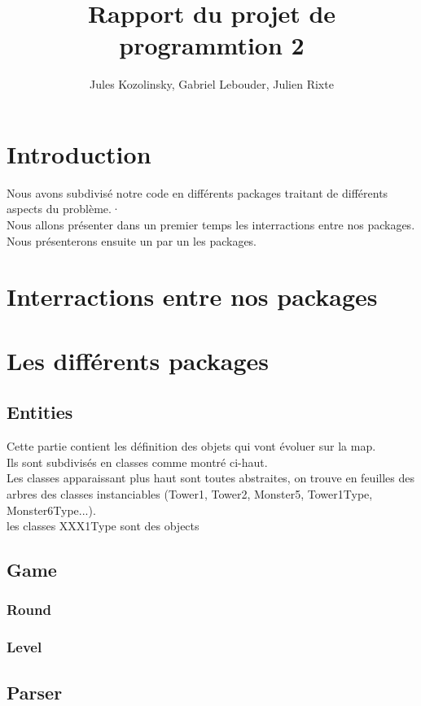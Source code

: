 \documentclass{article}
\title{Rapport du projet de programmtion 2}
\author{Jules Kozolinsky, Gabriel Lebouder, Julien Rixte}
\begin{document}
\maketitle

\section{Introduction}

Nous avons subdivisé notre code en différents packages traitant de différents aspects du problème.·\\  Nous allons présenter dans un premier temps les interractions entre nos packages.\\  Nous présenterons ensuite un par un les packages.

\section{Interractions entre nos packages}

\section{Les différents packages}

\subsection{Entities}
Cette partie contient les définition des objets qui vont évoluer sur la map.\\
Ils sont subdivisés en classes comme montré ci-haut.\\
Les classes apparaissant plus haut sont toutes abstraites, on trouve en feuilles des arbres des classes instanciables (Tower1, Tower2, Monster5, Tower1Type, Monster6Type...).\\
les classes XXX1Type sont des objects
\subsection{Game}
\subsubsection{Round}
\subsubsection{Level}

\subsection{Parser}
\end{document}
